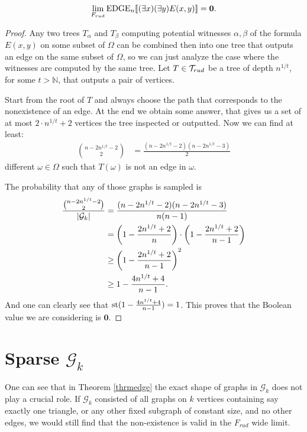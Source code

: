 \begin{thrm}\label{thrmedge}
\[\lim_{F_{rud}}\text{EDGE}_n[\![(\exists x)(\exists y)E(x,y)]\!]=\textbf{0}.\]
\end{thrm}
\begin{proof}
Any two trees $T_\alpha$ and $T_\beta$ computing potential witnesses $\alpha,\beta$ of the formula $E(x,y)$ on some subset of $\Omega$ can be combined then into one tree that outputs an edge on the same subset of $\Omega$, so we can just analyze the case where the witnesses are computed by the same tree.
Let $T\in \mathcal{T}_{rud}$ be a tree of depth $n^{1/t}$, for some $t>\mathbb{N}$, that outputs a pair of vertices.

Start from the root of $T$ and always choose the path that corresponds to the nonexistence of an edge. At the end we obtain some answer, that gives us a set of at most $2 \cdot n^{1/t}+2$ vertices the tree inspected or outputted. Now we can find at least: 
\begin{align}
\binom{n-2n^{1/t}-2}{2}&=\frac{(n-2n^{1/t}-2)(n-2n^{1/t}-3)}{2}
\end{align}
different $\omega\in\Omega$ such that $T(\omega)$ is not an edge in $\omega$. 

The probability that any of those graphs is sampled is
\begin{align}
\frac{\binom{n-2n^{1/t}-2}{2}}{\left|{\mathcal{G}_k}\right|}&=\frac{(n-2n^{1/t}-2)(n-2n^{1/t}-3)}{n(n-1)}\\
&=\left(1-\frac{2n^{1/t}+2}{n}\right)\cdot\left(1-\frac{2n^{1/t}+2}{n-1}\right)\\
&\geq \left(1-\frac{2n^{1/t}+2}{n-1}\right)^2\\
&\geq 1-\frac{4n^{1/t}+4}{n-1}.
\end{align}
And one can clearly see that $\text{st}(1-\frac{4n^{1/t}+4}{n-1})=1$. This proves that the Boolean value we are considering is $\textbf{0}$.
\end{proof}

\section{Sparse \texorpdfstring{$\mathcal{G}_k$}{Gk}}

One can see that in Theorem \ref{thrmedge} the exact shape of graphs in $\mathcal{G}_k$ does not play a crucial role. If $\mathcal{G}_k$ consisted of all graphs on $k$ vertices containing say exactly one triangle, or any other fixed subgraph of constant size, and no other edges, we would still find that the non-existence is valid in the $F_{rud}$ wide limit.

